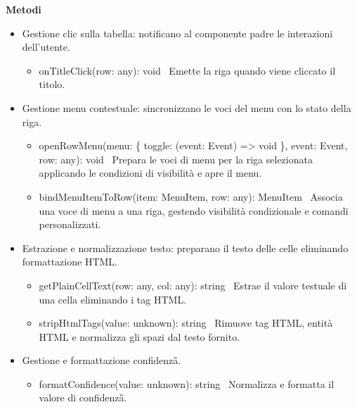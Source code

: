\documentclass[a4paper,11pt]{article}
\begin{document}
\textbf{Metodi}
\begin{itemize}[noitemsep, topsep=0pt]
  \item Gestione clic sulla tabella: notificano al componente padre le interazioni dell'utente.
  \begin{itemize}[noitemsep, topsep=0pt]
    \item onTitleClick(row: any): void \
    Emette la riga quando viene cliccato il titolo.
  \end{itemize}

  \item Gestione menu contestuale: sincronizzano le voci del menu con lo stato della riga.
  \begin{itemize}[noitemsep, topsep=0pt]
    \item openRowMenu(menu: \{ toggle: (event: Event) => void \}, event: Event, row: any): void \
    Prepara le voci di menu per la riga selezionata applicando le condizioni di visibilità e apre il menu.

    \item bindMenuItemToRow(item: MenuItem, row: any): MenuItem \
    Associa una voce di menu a una riga, gestendo visibilità condizionale e comandi personalizzati.
  \end{itemize}

  \item Estrazione e normalizzazione testo: preparano il testo delle celle eliminando formattazione HTML.
  \begin{itemize}[noitemsep, topsep=0pt]
    \item getPlainCellText(row: any, col: any): string \
    Estrae il valore testuale di una cella eliminando i tag HTML.

    \item stripHtmlTags(value: unknown): string \
    Rimuove tag HTML, entità HTML e normalizza gli spazi dal testo fornito.
  \end{itemize}
  \item Gestione e formattazione confidenza\G{}.
  \begin{itemize}[noitemsep, topsep=0pt]
    \item formatConfidence(value: unknown): string \
    Normalizza e formatta il valore di confidenza\G{}.
  \end{itemize}
\end{itemize}
\end{document}
